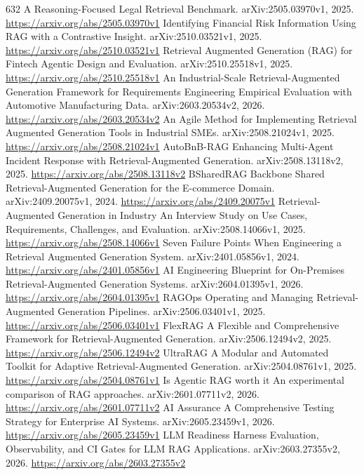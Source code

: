 \documentclass[11pt]{article}
\begin{document}
\begin{thebibliography}{632}
 A Reasoning-Focused Legal Retrieval Benchmark. arXiv:2505.03970v1, 2025. \url{https://arxiv.org/abs/2505.03970v1}
 Identifying Financial Risk Information Using RAG with a Contrastive Insight. arXiv:2510.03521v1, 2025. \url{https://arxiv.org/abs/2510.03521v1}
 Retrieval Augmented Generation (RAG) for Fintech Agentic Design and Evaluation. arXiv:2510.25518v1, 2025. \url{https://arxiv.org/abs/2510.25518v1}
 An Industrial-Scale Retrieval-Augmented Generation Framework for Requirements Engineering Empirical Evaluation with Automotive Manufacturing Data. arXiv:2603.20534v2, 2026. \url{https://arxiv.org/abs/2603.20534v2}
 An Agile Method for Implementing Retrieval Augmented Generation Tools in Industrial SMEs. arXiv:2508.21024v1, 2025. \url{https://arxiv.org/abs/2508.21024v1}
 AutoBnB-RAG Enhancing Multi-Agent Incident Response with Retrieval-Augmented Generation. arXiv:2508.13118v2, 2025. \url{https://arxiv.org/abs/2508.13118v2}
 BSharedRAG Backbone Shared Retrieval-Augmented Generation for the E-commerce Domain. arXiv:2409.20075v1, 2024. \url{https://arxiv.org/abs/2409.20075v1}
 Retrieval-Augmented Generation in Industry An Interview Study on Use Cases, Requirements, Challenges, and Evaluation. arXiv:2508.14066v1, 2025. \url{https://arxiv.org/abs/2508.14066v1}
 Seven Failure Points When Engineering a Retrieval Augmented Generation System. arXiv:2401.05856v1, 2024. \url{https://arxiv.org/abs/2401.05856v1}
 AI Engineering Blueprint for On-Premises Retrieval-Augmented Generation Systems. arXiv:2604.01395v1, 2026. \url{https://arxiv.org/abs/2604.01395v1}
 RAGOps Operating and Managing Retrieval-Augmented Generation Pipelines. arXiv:2506.03401v1, 2025. \url{https://arxiv.org/abs/2506.03401v1}
 FlexRAG A Flexible and Comprehensive Framework for Retrieval-Augmented Generation. arXiv:2506.12494v2, 2025. \url{https://arxiv.org/abs/2506.12494v2}
 UltraRAG A Modular and Automated Toolkit for Adaptive Retrieval-Augmented Generation. arXiv:2504.08761v1, 2025. \url{https://arxiv.org/abs/2504.08761v1}
 Is Agentic RAG worth it An experimental comparison of RAG approaches. arXiv:2601.07711v2, 2026. \url{https://arxiv.org/abs/2601.07711v2}
 AI Assurance A Comprehensive Testing Strategy for Enterprise AI Systems. arXiv:2605.23459v1, 2026. \url{https://arxiv.org/abs/2605.23459v1}
 LLM Readiness Harness Evaluation, Observability, and CI Gates for LLM RAG Applications. arXiv:2603.27355v2, 2026. \url{https://arxiv.org/abs/2603.27355v2}

\end{thebibliography}
\end{document}

